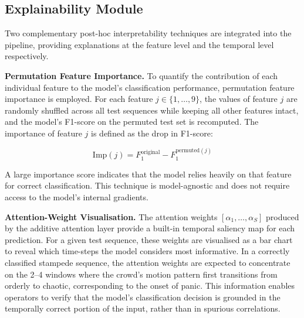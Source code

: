 \subsection{Explainability Module}

Two complementary post-hoc interpretability techniques are integrated into the pipeline, providing explanations at the feature level and the temporal level respectively.

\textbf{Permutation Feature Importance.} To quantify the contribution of each individual feature to the model's classification performance, permutation feature importance \cite{lundberg2017unified} is employed. For each feature $j \in \{1, \ldots, 9\}$, the values of feature $j$ are randomly shuffled across all test sequences while keeping all other features intact, and the model's F1-score on the permuted test set is recomputed. The importance of feature $j$ is defined as the drop in F1-score:

\begin{equation}
  \text{Imp}(j) = F_1^{\text{original}} - F_1^{\text{permuted}(j)}
  \label{eq:importance}
\end{equation}

A large importance score indicates that the model relies heavily on that feature for correct classification. This technique is model-agnostic and does not require access to the model's internal gradients.

\textbf{Attention-Weight Visualisation.} The attention weights $[\alpha_1, \ldots, \alpha_S]$ produced by the additive attention layer provide a built-in temporal saliency map for each prediction. For a given test sequence, these weights are visualised as a bar chart to reveal which time-steps the model considers most informative. In a correctly classified stampede sequence, the attention weights are expected to concentrate on the 2--4 windows where the crowd's motion pattern first transitions from orderly to chaotic, corresponding to the onset of panic. This information enables operators to verify that the model's classification decision is grounded in the temporally correct portion of the input, rather than in spurious correlations.
